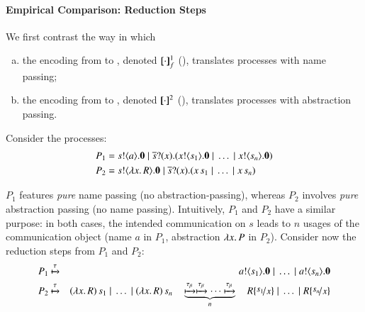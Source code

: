 \documentclass[preprint,11pt]{elsarticle}
\begin{document}
{{\paragraph{Empirical Comparison: Reduction Steps}
We first contrast the way in which 
\begin{enumerate}[a)]
\item 
the encoding from \HOp to \HO, denoted $[\!\![\cdot]\!\!]^1_f$ (), translates processes with name passing;
\item 
the encoding from \HOp to \sessp, denoted $[\!\![\cdot]\!\!]^2$ (), translates processes with abstraction passing.
\end{enumerate}
Consider the \HOp processes:
\begin{align*}
P_1 & =  s ! \langle a \rangle . \mathbf{0} \;|\; \overline{s} ? (x) . (x ! \langle s_1 \rangle . \mathbf{0} \;|\; \dots \;|\; x ! \langle s_n \rangle . \mathbf{0}) 
\\
P_2 & =  s ! \langle \lambda x.\,R \rangle . \mathbf{0} \;|\; \overline{s} ? (x) . (x\, {s_1} \;|\; \dots \;|\; x\, {s_n})
\end{align*}

 $P_1$ features \emph{pure} name passing (no abstraction-passing), whereas 
$P_2$ involves \emph{pure} abstraction passing (no name passing). Intuitively, 
$P_1$ and $P_2$ have a similar purpose:
in both cases, 
the intended communication on $s$ leads to $n$ usages of the communication object (name $a$ in $P_1$, abstraction $\lambda x.\,P$ in $P_2$).
Consider now the reduction steps from $P_1$ and $P_2$:
\begin{eqnarray*}
P_1 & \hby{\tau} & \bout{a}{s_1} \inact \Par \dots \Par \bout{a}{s_n} \inact \\
P_2 & \hby{\tau}& \appl{(\abs{x}{R})}{s_1} \Par \dots \Par \appl{(\abs{x}{R})}{s_n} \quad 
\underbrace{\hby{\btau}\hby{\btau} \cdots \hby{\btau}}_{n} 
\quad R \subst{s_1}{x} \Par \dots \Par R \subst{s_n}{x} 
\end{eqnarray*}

}}
\end{document}
